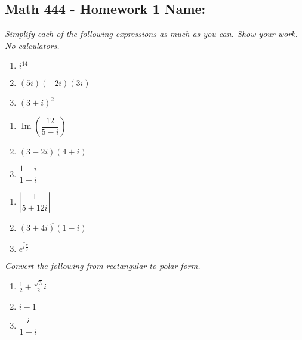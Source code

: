 \documentclass[11pt]{article}
\newcommand{\im}{\operatorname{Im}}
\begin{document}
\pagestyle{empty}
\subsection*{Math 444 - Homework 1 \hfill Name: \underline{\hspace*{2in}}}
\textit{Simplify each of the following expressions as much as you can. Show your work. No calculators.} 
\begin{multicols}{3}
\begin{enumerate}
\item $i^{14}$ %
\item $(5i)(-2i)(3i)$ %
\item $(3+i)^2$ %
\setcounter{enumCount}{\theenumi}
\end{enumerate}
\end{multicols}
\vfill

\begin{multicols}{3}
\begin{enumerate}
\setcounter{enumi}{\theenumCount}
\item $\im \left(\dfrac{12}{5 - i}\right)$ %
\item $(3-2i)(4+i)$ %
\item $\dfrac{1-i}{1+i}$ %
\setcounter{enumCount}{\theenumi}
\end{enumerate}
\end{multicols}
\vfill

\begin{multicols}{3}
\begin{enumerate}
\setcounter{enumi}{\theenumCount}
\item $ \left|\dfrac{1}{5 + 12i}\right|$ %
\item $\overline{(3+4i)(1-i)}$ %
\item $\overline{e^{i\frac{\pi}{3}}}$ %
\setcounter{enumCount}{\theenumi}
\end{enumerate}
\end{multicols}
\vfill

\noindent
\textit{Convert the following from rectangular to polar form.}
\begin{multicols}{3}
\begin{enumerate}
\setcounter{enumi}{\theenumCount}
\item $\tfrac{1}{2} + \tfrac{\sqrt{3}}{2}i$ %
\item $i-1$ %
\item $\dfrac{i}{1+i}$ %
\setcounter{enumCount}{\theenumi}
\end{enumerate}
\end{multicols}
\vfill
\end{document}

